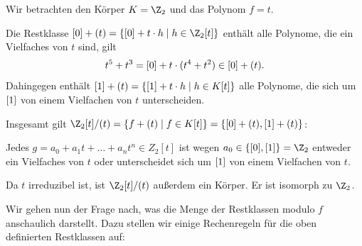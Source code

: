 \begin{example}
 Wir betrachten den Körper $K = \Z_2$ und das Polynom $f = t$. 
 
 Die Restklasse $\ol 0 + (t) = \{\ol 0 + t \cdot h\mid h \in \Z_2[t]\}$ enthält alle Polynome, die ein Vielfaches von $t$ sind, \zB gilt 
 \[t^5 + t^3 = [0] + t \cdot (t^4 + t^2) \in [0] + (t).\]
 Dahingegen enthält $[1] + (t) = \{[1] + t \cdot h\mid h \in K[t]\}$ alle Polynome, die sich um $[1]$ von einem Vielfachen von $t$ unterscheiden. 
 
 Insgesamt gilt $\Z_2[t]/(t) = \{f + (t)\mid f \in K[t]\} = \{\ol 0 + (t), \ol 1 + (t)\}$: 
 
 Jedes $g = a_0 + a_1t + \dotsc + a_nt^n \in Z_2[t]$ ist wegen $a_0 \in \{\ol 0, \ol 1\} = \Z_2$ entweder ein Vielfaches von $t$ oder unterscheidet sich um $[1]$ von einem Vielfachen von $t$.
 
 Da $t$ irreduzibel ist, ist $\Z_2[t]/(t)$ außerdem ein Körper. Er ist isomorph zu $\Z_2$.
\end{example}

Wir gehen nun der Frage nach, was die Menge der Restklassen modulo $f$ anschaulich darstellt. Dazu stellen wir einige Rechenregeln für die oben definierten Restklassen auf:

